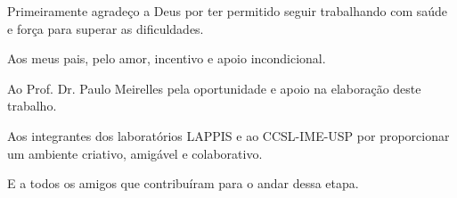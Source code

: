 \begin{agradecimentos}
Primeiramente agradeço a Deus por ter permitido seguir trabalhando com saúde e força para superar as dificuldades.

Aos meus pais, pelo amor, incentivo e apoio incondicional.

Ao Prof. Dr. Paulo Meirelles pela oportunidade e apoio na elaboração deste trabalho.

Aos integrantes dos laboratórios LAPPIS e ao CCSL-IME-USP por proporcionar um ambiente criativo, amigável e colaborativo.

E a todos os amigos que contribuíram para o andar dessa etapa.
\end{agradecimentos} 